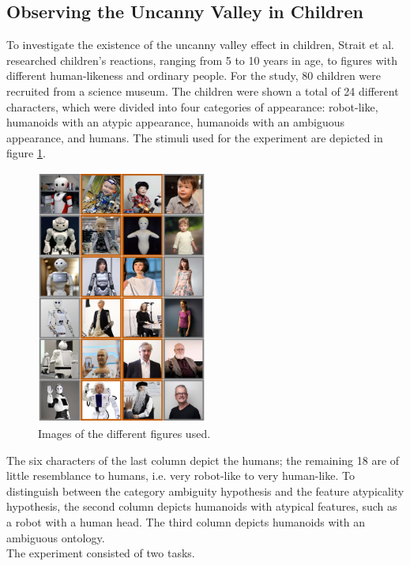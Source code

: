 \subsection{Observing the Uncanny Valley in Children}
To investigate the existence of the uncanny valley effect in children, Strait et al. \cite{childrens_responding} researched children's reactions, ranging from 5 to 10 years in age, to figures with different human-likeness and ordinary people. For the study, 80 children were recruited from a science museum. The children were shown a total of 24 different characters, which were divided into four categories of appearance: robot-like, humanoids with an atypic appearance, humanoids with an ambiguous appearance, and humans. The stimuli used for the experiment are depicted in figure \ref{fig:childrensRespondingAvatars}.
\begin{figure} %
    \centering
    \includegraphics[width=0.5\textwidth]{graphics/childrens_responding_avatars.png}
    \caption{Images of the different figures used.}
    \label{fig:childrensRespondingAvatars}
\end{figure}
The six characters of the last column depict the humans; the remaining 18 are of little resemblance to humans, i.e. very robot-like to very human-like. To distinguish between the category ambiguity hypothesis and the feature atypicality hypothesis, the second column depicts humanoids with atypical features, such as a robot with a human head. The third column depicts humanoids with an ambiguous ontology.\\
The experiment consisted of two tasks.
